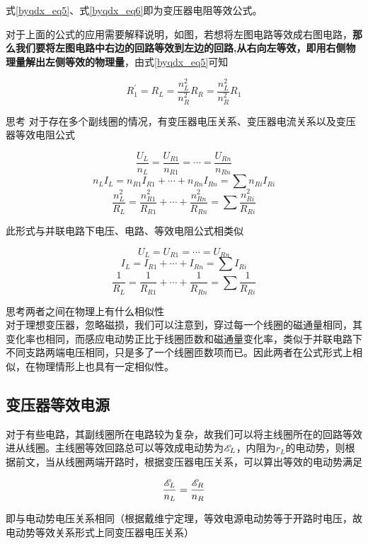 式\eqref{byqdx_eq5}、式\eqref{byqdx_eq6}即为变压器电阻等效公式。



对于上面的公式的应用需要解释说明，如图，若想将左图电路等效成右图电路，\textbf{那么我们要将左图电路中右边的回路等效到左边的回路,从右向左等效，即用右侧物理量解出左侧等效的物理量}，由式\eqref{byqdx_eq5}可知

$$R_1^{\prime} = R_L = \frac{n_L^2}{n_R^2} R_R = \frac{n_L^2}{n_R^2} R_1$$

\begin{mk}{思考}{}
对于存在多个副线圈的情况，有变压器电压关系、变压器电流关系以及变压器等效电阻公式

$$\frac{U_L}{n_L} = \frac{U_{R1}}{n_{R1}} = \cdots = \frac{U_{Rn}}{n_{Rn}}$$
$$n_L I_L = n_{R1} I_{R1} + \cdots + n_{Rn} I_{Rn} = \sum n_{Ri} I_{Ri}$$
$$\frac{n_{L}^2}{R_L} =\frac{n_{R1}^2}{R_{R1}} + \cdots + \frac{n_{Rn}^2}{R_{Rn}} = \sum \frac{n_{Ri}^2}{R_{Ri}}$$

此形式与并联电路下电压、电路、等效电阻公式相类似

$$U_L = U_{R1} = \cdots = U_{Rn}$$
$$I_L = I_{R1} + \cdots + I_{Rn} = \sum I_{Ri}$$
$$\frac{1}{R_L} = \frac{1}{R_{R1}} + \cdots + \frac{1}{R_{Rn}} = \sum \frac{1}{R_{Ri}}$$

思考两者之间在物理上有什么相似性
~\\

对于理想变压器，忽略磁损，我们可以注意到，穿过每一个线圈的磁通量相同，其变化率也相同，而感应电动势正比于线圈匝数和磁通量变化率，类似于并联电路下不同支路两端电压相同，只是多了一个线圈匝数项而已。因此两者在公式形式上相似，在物理情形上也具有一定相似性。
\end{mk}

\subsection{变压器等效电源}



对于有些电路，其副线圈所在电路较为复杂，故我们可以将主线圈所在的回路等效进从线圈。主线圈等效回路总可以等效成电动势为$\mathscr{E}_L$，内阻为$r_L$的电动势，则根据前文，当从线圈两端开路时，根据变压器电压关系，可以算出等效的电动势满足

$$\frac{\mathscr{E}_L}{n_L} = \frac{\mathscr{E}_R}{n_R}$$

即与电动势电压关系相同（根据戴维宁定理，等效电源电动势等于开路时电压，故电动势等效关系形式上同变压器电压关系）


